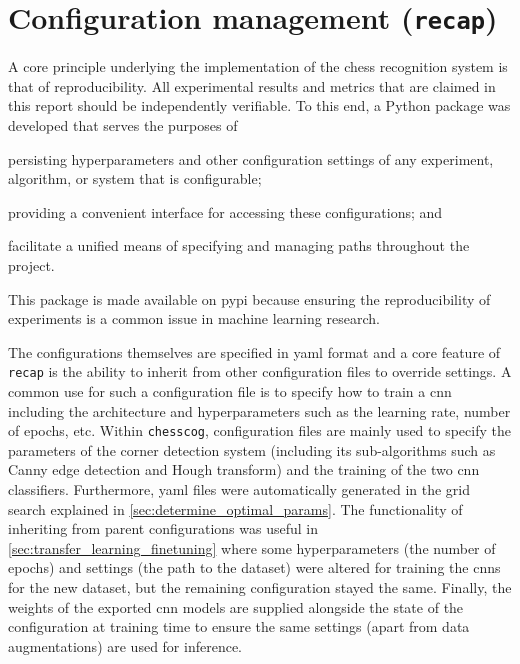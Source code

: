 \documentclass[../main.tex]{subfiles}
\begin{document}
\section{Configuration management (\texttt{recap})}
A core principle underlying the implementation of the chess recognition system is that of reproducibility.
All experimental results and metrics that are claimed in this report should be independently verifiable.
To this end, a Python package was developed that serves the purposes of 
\begin{enumerate*}[label=(\roman*)]
    \item persisting hyperparameters and other configuration settings of any experiment, algorithm, or system that is configurable;
    \item providing a convenient interface for accessing these configurations; and
    \item facilitate a unified means of specifying and managing paths throughout the project.
\end{enumerate*}
This package is made available on \gls{pypi} because ensuring the reproducibility of experiments is a common issue in machine learning research.

The configurations themselves are specified in \gls{yaml} format and a core feature of \texttt{recap} is the ability to inherit from other configuration files to override settings.
A common use for such a configuration file is to specify how to train a \gls{cnn} including the architecture and hyperparameters such as the learning rate, number of epochs, etc.
Within \texttt{chesscog}, configuration files are mainly used to specify the parameters of the corner detection system (including its sub-algorithms such as Canny edge detection and Hough transform) and the training of the two \gls{cnn} classifiers.
Furthermore, \gls{yaml} files were automatically generated in the grid search explained in \cref{sec:determine_optimal_params}.
The functionality of inheriting from parent configurations was useful in \cref{sec:transfer_learning_finetuning} where some hyperparameters (the number of epochs) and settings (the path to the dataset) were altered for training the \glspl{cnn} for the new dataset, but the remaining configuration stayed the same.
Finally, the weights of the exported \gls{cnn} models are supplied alongside the state of the configuration at training time to ensure the same settings (apart from data augmentations) are used for inference.
\end{document}
